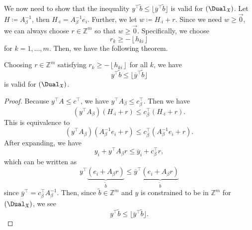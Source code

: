 We now need to show that the inequality \(y^{\top}\widetilde{b}\leq \lfloor \overline{y}^{\top}\widetilde{b} \rfloor\) is valid for \((\Dual_{\mathfrak{X}})\). Let \(H\coloneqq A^{-1}_{\beta}\), then \(H_{\cdot i} = A^{-1}_{\beta}e_{i}\). Further, we let \(w\coloneqq H_{\cdot i}+r\). Since we need \(w\geq \vec{0}\), we can always choose \(r\in \mathbb{Z}^m\) so that \(w\geq \vec{0}\). Specifically, we choose
\[
	r_k \geq -\left\lfloor h_{ki} \right\rfloor
\]
for \(k = 1, \dots , m\). Then, we have the following theorem.

\begin{theorem}\label{thm:lec24-2}
	Choosing \(r\in\mathbb{Z} ^m\) satisfying \(r_k \geq - \left\lfloor h_{ki} \right\rfloor\) for all \(k\), we have
	\[
		y^{\top} \widetilde{b} \leq \lfloor \overline{y} ^{\top} \widetilde{b} \rfloor
	\]
	is valid for \((\Dual_{\mathfrak{X}})\).
\end{theorem}
\begin{proof}
	Because \(y^{\top}A\leq c^{\top}\), we have \(y^{\top}A_{\beta}\leq c_{\beta}^{\top}\). Then we have
	\[
		\left(y^{\top}A_{\beta}\right)\left(H_{\cdot i}+r\right) \leq c_{\beta}^{\top}\left(H_{\cdot i}+r\right).
	\]
	This is equivalence to
	\[
		\left(y^{\top}A_{\beta}\right)\left(A^{-1}_{\beta}e_{i}+r\right) \leq c_{\beta}^{\top}\left(A^{-1}_{\beta}e_{i}+r\right).
	\]
	After expanding, we have
	\[
		y_{i}+y^{\top}A_{\beta}r\leq \overline{y}_{i}+c_{\beta}^{\top}r,
	\]
	which can be written as
	\[
		y^{\top}\underbrace{\left(e_{i}+A_{\beta}r\right)}_{\widetilde{b} } \leq \overline{y}^{\top} \underbrace{\left(e_{i}+A_{\beta}r\right)}_{\widetilde{b}}
	\]
	since \(\overline{y}^{\top} = c_{\beta}^{\top}A^{-1}_{\beta}\). Then, since \(\widetilde{b} \in \mathbb{Z} ^m\) and \(y\) is constrained to be
	in \(\mathbb{Z} ^m\) for \((\Dual_{\mathfrak{X}})\), we see
	\[
		y^{\top}\widetilde{b}\leq \lfloor \overline{y}^{\top}\widetilde{b} \rfloor.
	\]
\end{proof}

